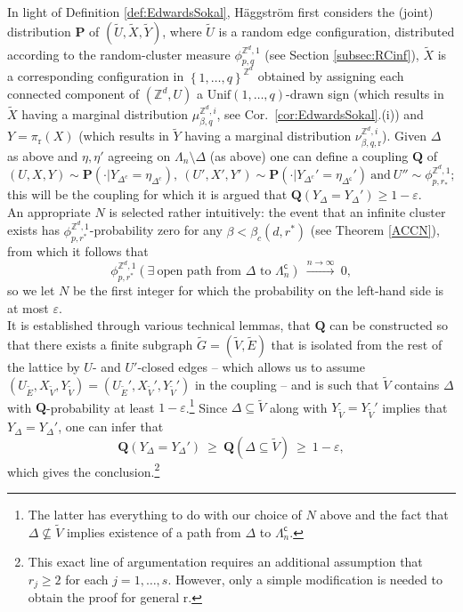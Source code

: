 \documentclass[12pt]{article}
\newcommand{\PP}{\mathbf{P}}
\newcommand{\Q}{\mathbf{Q}}
\renewcommand{\r}{\mathrm{r}}
\newcommand{\Z}{\mathbb{Z}}
\newcommand{\set}[1]{\left\{#1\right\}}
\newcommand{\ra}{\rightarrow}
\newcommand{\pika}{\boldsymbol{\cdot}}
\newcommand{\1}{\mathbbm{1}}
\renewcommand{\c}{\mathsf{c}}
\newcommand{\5}{\vspace{0.5cm}}
\renewcommand{\tilde}{\widetilde}
\theoremstyle{definition}
\begin{document}
In light of Definition \ref{def:EdwardsSokal}, H\"aggstr\"om first considers the (joint) distribution $\PP$ of $(\tilde{U},\tilde{X},\tilde{Y})$, where $\tilde{U}$ is a random edge configuration, distributed according to the random-cluster measure $\phi_{p,q}^{\Z^d,1}$ (see Section \ref{subsec:RCinf}), $\tilde{X}$ is a corresponding configuration in $\set{1,\ldots,q}^{\Z^d}$ obtained by assigning each connected component of $(\Z^d,U)$ a $\mathrm{Unif}(1,\ldots,q)$-drawn sign (which results in $\tilde{X}$ having a marginal distribution $\mu_{\beta,q}^{\Z^d, i}$, see Cor.~\ref{cor:EdwardsSokal}.(i)) and $Y=\pi_\r(X)$ (which results in $\tilde{Y}$ having a marginal distribution $\nu_{\beta,q,\r}^{\Z^d,i}$). Given $\Delta$ as above and $\eta,\eta'$ agreeing on $\Lambda_n\setminus\Delta$ (as above) one can define a coupling $\Q$ of 
$$(U,X,Y)\sim\PP(\pika|Y_{\Delta^c}=\eta_{\Delta^c}),~(U',X',Y')\sim\PP(\pika|Y_{\Delta^c}'=\eta_{\Delta^\c}')~\text{and}~U''\sim\phi_{p,r_*}^{\Z^d,1};$$
this will be the coupling for which it is argued that $\Q(Y_{\Delta}=Y_{\Delta}')\geq 1-\varepsilon$. \\

An appropriate $N$ is selected rather intuitively: the event that an infinite cluster exists has $\phi_{p,r^*}^{\Z^d,1}$-probability zero for any $\beta<\beta_c(d,r^*)$ (see Theorem \ref{ACCN}), from which it follows that
$$\phi_{p,r^*}^{\Z^d,1}(\exists~\text{open path from $\Delta$ to $\Lambda_n^\c$}) ~\xrightarrow{n\ra\infty}~ 0,$$
so we let $N$ be the first integer for which the probability on the left-hand side is at most $\varepsilon$. \\

It is established through various technical lemmas, that $\Q$ can be constructed so that there exists a finite subgraph $\tilde{G}=(\tilde{V},\tilde{E})$ that is isolated from the rest of the lattice by $U$- and $U'$-closed edges -- which allows us to assume $(U_{\tilde{E}},X_{\tilde{V}},Y_{\tilde{V}})=(U_{\tilde{E}}',X_{\tilde{V}}',Y_{\tilde{V}}')$ in the coupling -- and is such that $\tilde{V}$ contains $\Delta$ with $\Q$-probability at least $1-\varepsilon$.\footnote{The latter has everything to do with our choice of $N$ above and the fact that $\Delta\not\subseteq\tilde{V}$ implies existence of a path from $\Delta$ to $\Lambda_n^\c$.} Since $\Delta\subseteq\tilde{V}$ along with $Y_{\tilde{V}}=Y_{\tilde{V}}'$ implies that $Y_{\Delta}=Y_{\Delta}'$, one can infer that 
$$\Q(Y_{\Delta}=Y_{\Delta}') ~\geq~ \Q(\Delta\subseteq\tilde{V}) ~\geq~ 1-\varepsilon,$$
which gives the conclusion.\footnote{This exact line of argumentation requires an additional assumption that $r_j\geq 2$ for each $j=1,\ldots,s$. However, only a simple modification is needed to obtain the proof for general $\r$.} \\
\end{document}
